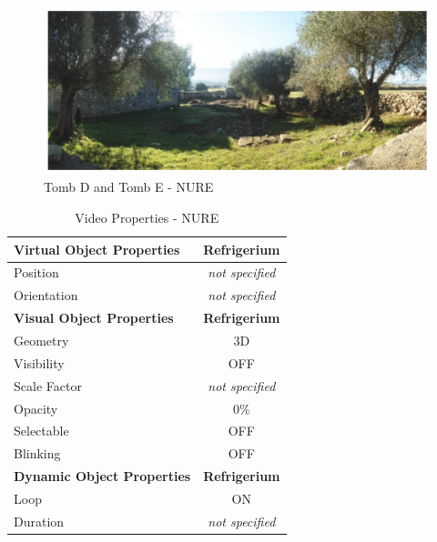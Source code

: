         \begin{figure}[h]
        	\centering
        	\includegraphics[width=\linewidth]{Figures/Conceptual Model/photoNURE/tombs.png}
        	\caption{Tomb D and Tomb E - NURE}
        	\label{fig:tombs}
        \end{figure}

        \begin{table}[h]
        \centering
        \begin{tabular}{|l|c|}
        \hline
        \textbf{Virtual Object Properties}                       & \textbf{Refrigerium}   \\ \hline
        Position                                                 & \textit{not specified} \\ \hline
        Orientation                                              & \textit{not specified} \\ \hline
        \textbf{Visual Object Properties}                        & \textbf{Refrigerium}   \\ \hline
        Geometry                                                 & 3D                     \\ \hline
        Visibility                                               & OFF                    \\ \hline
        Scale Factor                                             & \textit{not specified} \\ \hline
        Opacity                                                  & 0\%                    \\ \hline
        Selectable                                               & OFF                    \\ \hline
        Blinking                                                 & OFF                    \\ \hline
        \multicolumn{1}{|c|}{\textbf{Dynamic Object Properties}} & \textbf{Refrigerium}   \\ \hline
        Loop                                                     & ON                     \\ \hline
        Duration                                                 & \textit{not specified} \\ \hline
        \end{tabular}
        \caption{Video Properties - NURE}
        \label{tab:NUREVideoproperties}
        \end{table}

